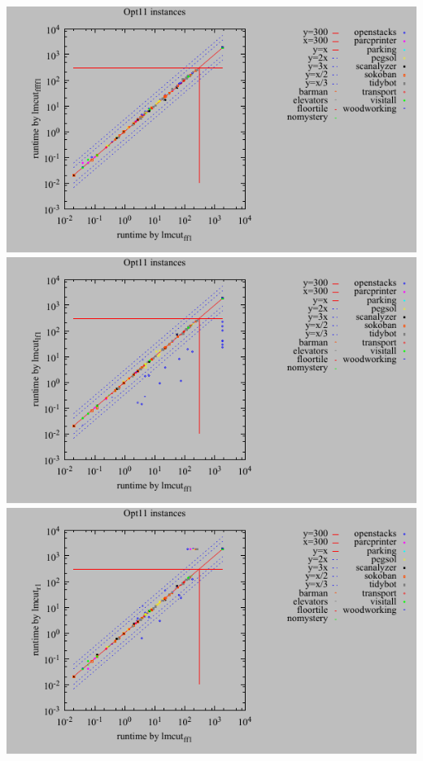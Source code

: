 \includegraphics{tables/opt11-time-lmcut_ff-lmcut_ffff.pdf}
\linebreak
\includegraphics{tables/opt11-time-lmcut_ff-lmcut_lf.pdf}
\linebreak
\includegraphics{tables/opt11-time-lmcut_ff-lmcut_r.pdf}
\linebreak
